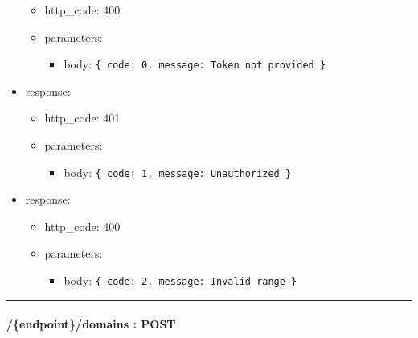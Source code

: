 \documentclass[
]{article}
\begin{document}
\begin{itemize}
  \begin{itemize}
  \item
    http\_code: 400
  \item
    parameters:

    \begin{itemize}
    \item
      body: \texttt{\{
      \textquotesingle{}code\textquotesingle{}:\ 0,\ 
      \textquotesingle{}message\textquotesingle{}:\ \textquotesingle{}Token\ not\ provided\textquotesingle{}
      \}}
    \end{itemize}
  \end{itemize}
\item
  response:

  \begin{itemize}
  \item
    http\_code: 401
  \item
    parameters:

    \begin{itemize}
    \item
      body: \texttt{\{
      \textquotesingle{}code\textquotesingle{}:\ 1,\ 
      \textquotesingle{}message\textquotesingle{}:\ \textquotesingle{}Unauthorized\textquotesingle{}
      \}}
    \end{itemize}
  \end{itemize}
\item
  response:

  \begin{itemize}
  \item
    http\_code: 400
  \item
    parameters:

    \begin{itemize}
    \item
      body: \texttt{\{
      \textquotesingle{}code\textquotesingle{}:\ 2,\ 
      \textquotesingle{}message\textquotesingle{}:\ \textquotesingle{}Invalid\ range\textquotesingle{}
      \}}
    \end{itemize}
  \end{itemize}
\end{itemize}

\begin{center}\rule{0.5\linewidth}{0.5pt}\end{center}

\hypertarget{header-n61071}{%
\paragraph{/\{endpoint\}/domains : POST}\label{header-n61071}}
\end{document}
